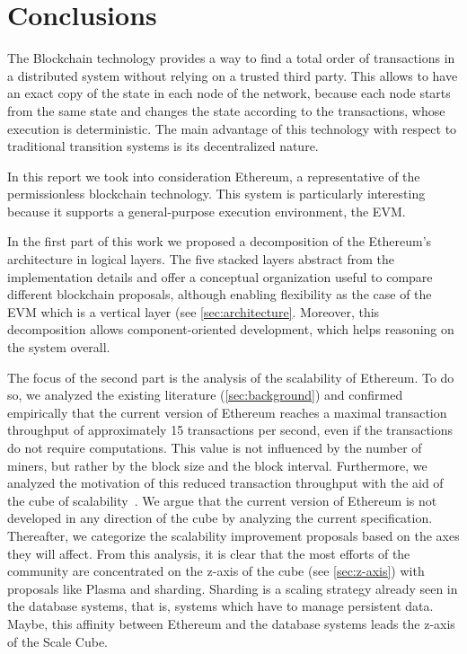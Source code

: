 \section{Conclusions}
\label{sec:conclusions}
The Blockchain technology provides a way to find a total order of transactions
in a distributed system without relying on a trusted third party. This allows
to have an exact copy of the state in each node of the network, because each
node starts from the same state and changes the state according to the
transactions, whose execution is deterministic. The main advantage of this
technology with respect to traditional transition systems is its decentralized
nature.

In this report we took into consideration Ethereum, a representative of the
permissionless blockchain technology. This system is particularly interesting
because it supports a general-purpose execution environment, the EVM.

In the first part of this work we proposed a decomposition of the Ethereum's
architecture in logical layers. The five stacked layers abstract from the
implementation details and offer a conceptual organization useful to compare
different blockchain proposals, although enabling flexibility as the case of the
EVM which is a vertical layer (see \autoref{sec:architecture}. Moreover, this
decomposition allows component-oriented development, which helps reasoning on the
system overall.

The focus of the second part is the analysis of the scalability of Ethereum. To
do so, we analyzed the existing literature (\autoref{sec:background}) and
confirmed empirically that the current version of Ethereum reaches a maximal
transaction throughput of approximately 15 transactions per second, even if the
transactions do not require computations. This value is not influenced by the
number of miners, but rather by the block size and the block interval.
Furthermore, we analyzed the motivation of this reduced transaction throughput
with the aid of the cube of scalability~\cite{bib:art-of-scalability}. We argue
that the current version of Ethereum is not developed in any direction of the
cube by analyzing the current specification. Thereafter, we categorize the
scalability improvement proposals based on the axes they will affect. From this
analysis, it is clear that the most efforts of the community are concentrated on
the z-axis of the cube (see \autoref{sec:z-axis}) with proposals like Plasma and
sharding. Sharding is a scaling strategy already seen in the database systems,
that is, systems which have to manage persistent data. Maybe, this affinity
between Ethereum and the database systems leads the z-axis of the Scale Cube.
